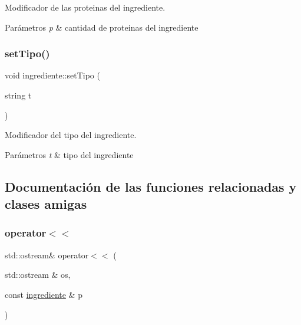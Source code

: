 Modificador de las proteinas del ingrediente. 


\begin{DoxyParams}{Parámetros}
{\em p} & cantidad de proteinas del ingrediente \\
\hline
\end{DoxyParams}
\mbox{\label{classingrediente_ae51c71ad615844974ee24bb2fe9c7b80}} 
\subsubsection{\texorpdfstring{set\+Tipo()}{setTipo()}}
{\footnotesize\ttfamily void ingrediente\+::set\+Tipo (\begin{DoxyParamCaption}\item[{string}]{t }\end{DoxyParamCaption})}



Modificador del tipo del ingrediente. 


\begin{DoxyParams}{Parámetros}
{\em t} & tipo del ingrediente \\
\hline
\end{DoxyParams}


\subsection{Documentación de las funciones relacionadas y clases amigas}
\mbox{\label{classingrediente_ae7d30d9b20aead90a4d3b11a4ff57e21}} 
\subsubsection{\texorpdfstring{operator$<$$<$}{operator<<}}
{\footnotesize\ttfamily std\+::ostream\& operator$<$$<$ (\begin{DoxyParamCaption}\item[{std\+::ostream \&}]{os,  }\item[{const \hyperlink{classingrediente}{ingrediente} \&}]{p }\end{DoxyParamCaption})\hspace{0.3cm}{\ttfamily [friend]}}



